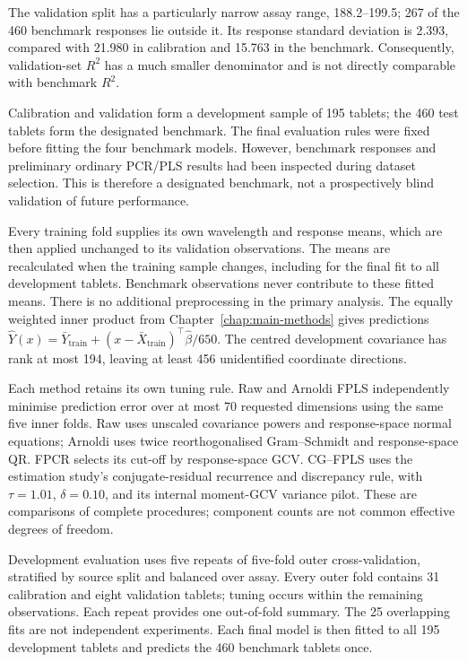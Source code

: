 The validation split has a particularly narrow assay range, 188.2--199.5;
267 of the 460 benchmark responses lie outside it.  Its response standard
deviation is 2.393, compared with 21.980 in calibration and 15.763 in the
benchmark.  Consequently, validation-set $R^2$ has a much smaller
denominator and is not directly comparable with benchmark $R^2$.

Calibration and validation form a development sample of 195 tablets; the
460 test tablets form the designated benchmark.  The final evaluation rules
were fixed before fitting the four benchmark models.  However, benchmark
responses and preliminary ordinary PCR/PLS results had been inspected during
dataset selection.  This is therefore a designated benchmark, not a
prospectively blind validation of future performance.

Every training fold supplies its own wavelength and response means, which
are then applied unchanged to its validation observations.  The means are
recalculated when the training sample changes, including for the final fit
to all development tablets.  Benchmark observations never contribute to
these fitted means.  There is no additional
preprocessing in the primary analysis.  The equally weighted inner product
from Chapter~\ref{chap:main-methods} gives predictions
$\widehat Y(x)=\bar Y_{\mathrm{train}}+
(x-\bar X_{\mathrm{train}})^\top\widehat\beta/650$.
The centred development covariance has rank at most 194, leaving at least
456 unidentified coordinate directions.

Each method retains its own tuning rule.  Raw and Arnoldi FPLS independently
minimise prediction error over at most 70 requested dimensions using the
same five inner folds.  Raw uses unscaled covariance powers and
response-space normal equations; Arnoldi uses twice reorthogonalised
Gram--Schmidt and response-space QR.  FPCR selects its cut-off by
response-space GCV.  CG--FPLS uses the estimation study's conjugate-residual
recurrence and discrepancy rule, with $\tau=1.01$, $\delta=0.10$, and its
internal moment-GCV variance pilot.  These are comparisons of complete
procedures; component counts are not common effective degrees of freedom.

Development evaluation uses five repeats of five-fold outer
cross-validation, stratified by source split and balanced over assay.
Every outer fold contains 31 calibration and eight validation tablets;
tuning occurs within the remaining observations.  Each repeat provides one
out-of-fold summary.  The 25 overlapping fits are not independent
experiments.  Each final model is then fitted to all 195 development
tablets and predicts the 460 benchmark tablets once.

